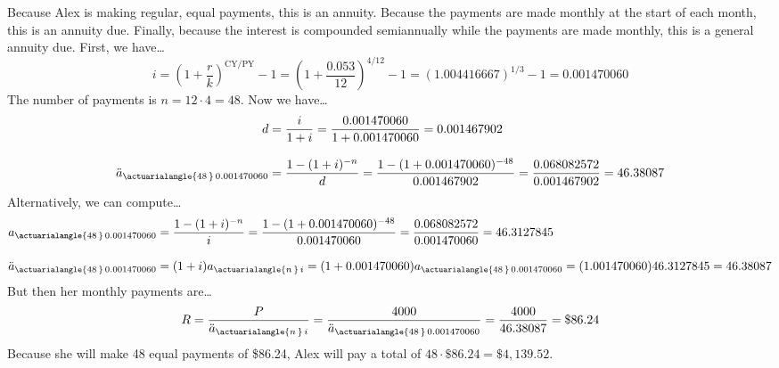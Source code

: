 \documentclass[11pt,letterpaper]{article}
\begin{document}
\sol Because Alex is making regular, equal payments, this is an annuity. Because the payments are made monthly at the start of each month, this is an annuity due. Finally, because the interest is compounded semiannually while the payments are made monthly, this is a general annuity due. First, we have\dots
	\[
	i= \left(1 + \dfrac{r}{k} \right)^{\text{CY}/\text{PY}} - 1= \left(1 + \dfrac{0.053}{12} \right)^{4/12} - 1= (1.004416667)^{1/3} - 1= 0.001470060
	\]
The number of payments is $n= 12 \cdot 4= 48$. Now we have\dots
	\[
	\begin{aligned}
	d&= \dfrac{i}{1 + i}= \dfrac{0.001470060}{1 + 0.001470060}= 0.001467902 \\[0.3cm]
	\ddot{a}_{\actuarialangle{48\,}\, 0.001470060}&= \dfrac{1 - (1 + i)^{-n}}{d}= \dfrac{1 - (1 + 0.001470060)^{-48}}{0.001467902}= \dfrac{0.068082572}{0.001467902}= 46.38087
	\end{aligned}
	\]
Alternatively, we can compute\dots
	\[
	\begin{aligned}
	a_{\actuarialangle{48\,}\, 0.001470060}&= \dfrac{1 - (1 + i)^{-n}}{i}= \dfrac{1 - (1 + 0.001470060)^{-48}}{0.001470060}= \dfrac{0.068082572}{0.001470060}= 46.3127845 \\[0.3cm]
	\ddot{a}_{\actuarialangle{48\,}\, 0.001470060}&= (1 + i) a_{\actuarialangle{n\,}\, i}= (1 + 0.001470060) a_{\actuarialangle{48\,}\, 0.001470060}= (1.001470060) 46.3127845= 46.38087
	\end{aligned}
	\]
But then her monthly payments are\dots
	\[
	R= \dfrac{P}{\ddot{a}_{\actuarialangle{n\,}\, i}}= \dfrac{4000}{\ddot{a}_{\actuarialangle{48\,}\, 0.001470060}}= \dfrac{4000}{46.38087}= \$86.24
	\]
Because she will make 48 equal payments of \$86.24, Alex will pay a total of $48 \cdot \$86.24= \$4,139.52$. 
\end{document}
